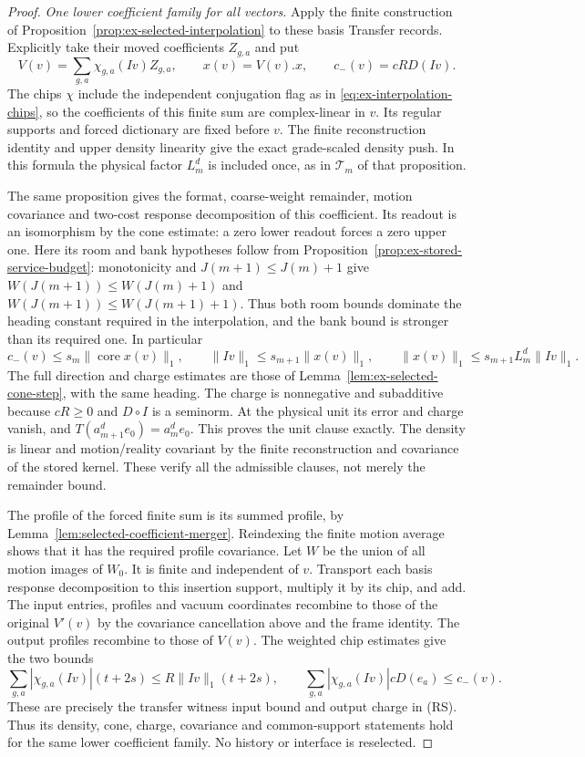 \begin{proof}
\emph{One lower coefficient family for all vectors.}
Apply the finite construction of
Proposition~\ref{prop:ex-selected-interpolation} to these basis
Transfer records. Explicitly take their moved coefficients $Z_{g,a}$ and put
\[
 V(v)=\sum_{g,a}\chi_{g,a}(Iv)Z_{g,a},\qquad
 x(v)=V(v).x,\qquad c_-(v)=cR D(Iv).
\]
The chips $\chi$ include the independent conjugation flag as in
\eqref{eq:ex-interpolation-chips}, so the coefficients of this finite
sum are complex-linear in $v$. Its regular supports and forced
dictionary are fixed before $v$. The finite reconstruction identity
and upper density linearity give the exact grade-scaled density
push. In this formula the physical factor $L_m^d$ is included once,
as in $\mathcal T_m$ of that proposition.

The same proposition gives the format, coarse-weight remainder,
motion covariance and two-cost response decomposition of this coefficient. Its
readout is an isomorphism by the cone estimate: a zero lower
readout forces a zero upper one. Here its room and bank hypotheses
follow from Proposition~\ref{prop:ex-stored-service-budget}:
monotonicity and $J(m+1)\le J(m)+1$ give
$W(J(m+1))\le W(J(m)+1)$ and
$W(J(m+1))\le W(J(m+1)+1)$. Thus both room bounds dominate the
heading constant required in the interpolation, and the bank bound
is stronger than its required one. In particular
\[
 c_-(v)\le s_m\|\operatorname{core}x(v)\|_1,
 \qquad
 \|Iv\|_1\le s_{m+1}\|x(v)\|_1,
 \qquad
 \|x(v)\|_1\le s_{m+1}L_m^d\|Iv\|_1.
\]
The full direction and charge estimates are those of
Lemma~\ref{lem:ex-selected-cone-step}, with the same heading.
The charge is nonnegative and subadditive because $cR\ge0$ and
$D\circ I$ is a seminorm. At the physical unit its error and
charge vanish, and
$T(a_{m+1}^de_0)=a_m^de_0$. This proves the unit clause exactly.
The density is linear and motion/reality covariant by the finite
reconstruction and covariance of the stored kernel. These verify
all the admissible clauses, not merely the remainder bound.

The profile of the forced finite sum is its summed profile, by
Lemma~\ref{lem:selected-coefficient-merger}. Reindexing the finite
motion average shows that it has the required profile covariance.
Let $W$ be the union of all motion images of $W_0$. It is finite and
independent of $v$. Transport each basis response decomposition to this insertion support, multiply
it by its chip, and add. The input entries, profiles and vacuum
coordinates recombine to those of the original $V'(v)$ by the
covariance cancellation above and the frame identity. The output
profiles recombine to those of $V(v)$. The weighted chip estimates
give the two bounds
\[
 \sum_{g,a}|\chi_{g,a}(Iv)|(t+2s)
       \le R\|Iv\|_1(t+2s),\qquad
 \sum_{g,a}|\chi_{g,a}(Iv)|cD(e_a)\le c_-(v).
\]
These are precisely the transfer witness input bound and output charge in (RS).
Thus its density, cone, charge, covariance and common-support statements
hold for the same lower coefficient family. No history or interface is reselected.
\end{proof}

